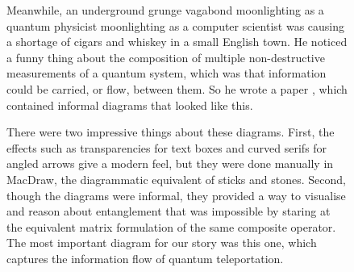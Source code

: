 \begin{figure}[h!]
\centering
{}
\caption{Meanwhile, an underground grunge vagabond moonlighting as a quantum physicist moonlighting as a computer scientist was causing a shortage of cigars and whiskey in a small English town. He noticed a funny thing about the composition of multiple non-destructive measurements of a quantum system, which was that information could be carried, or flow, between them. So he wrote a paper \citep{coecke_logic_2004}, which contained informal diagrams that looked like this.}
\end{figure}

\begin{figure}[h!]
\centering
{}
\caption{There were two impressive things about these diagrams. First, the effects such as transparencies for text boxes and curved serifs for angled arrows give a modern feel, but they were done manually in MacDraw, the diagrammatic equivalent of sticks and stones. Second, though the diagrams were informal, they provided a way to visualise and reason about entanglement that was impossible by staring at the equivalent matrix formulation of the same composite operator. The most important diagram for our story was this one, which captures the information flow of quantum teleportation.}
\end{figure}
\clearpage

